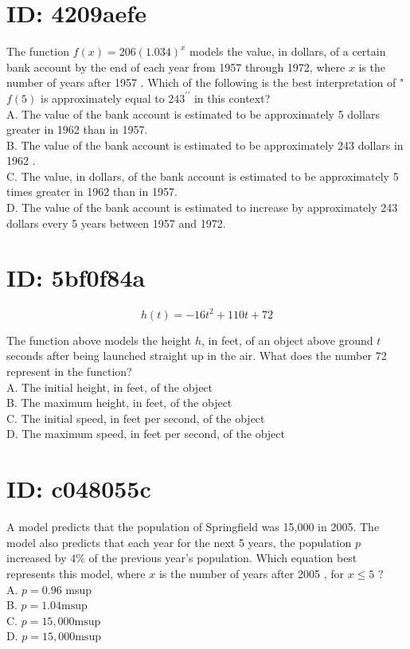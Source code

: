 \section*{ID: 4209aefe}
The function $f(x)=206(1.034)^{x}$ models the value, in dollars, of a certain bank account by the end of each year from 1957 through 1972, where $x$ is the number of years after 1957 . Which of the following is the best interpretation of " $f(5)$ is approximately equal to $243^{\prime \prime}$ in this context?\\
A. The value of the bank account is estimated to be approximately 5 dollars greater in 1962 than in 1957.\\
B. The value of the bank account is estimated to be approximately 243 dollars in 1962 .\\
C. The value, in dollars, of the bank account is estimated to be approximately 5 times greater in 1962 than in 1957.\\
D. The value of the bank account is estimated to increase by approximately 243 dollars every 5 years between 1957 and 1972.

\section*{ID: 5bf0f84a}
$$
h(t)=-16 t^{2}+110 t+72
$$

The function above models the height $h$, in feet, of an object above ground $t$ seconds after being launched straight up in the air. What does the number 72 represent in the function?\\
A. The initial height, in feet, of the object\\
B. The maximum height, in feet, of the object\\
C. The initial speed, in feet per second, of the object\\
D. The maximum speed, in feet per second, of the object

\section*{ID: c048055c}
A model predicts that the population of Springfield was 15,000 in 2005. The model also predicts that each year for the next 5 years, the population $p$ increased by $4 \%$ of the previous year's population. Which equation best represents this model, where $x$ is the number of years after 2005 , for $x \leq 5$ ?\\
A. $p=0.96$ msup\\
B. $p=1.04 \mathrm{msup}$\\
C. $p=15,000 \mathrm{msup}$\\
D. $p=15,000 \mathrm{msup}$

